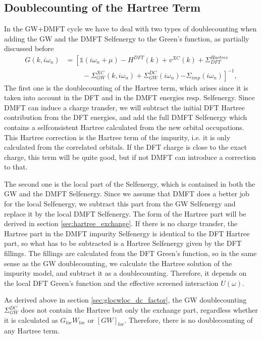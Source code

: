 \documentclass[12pt,a4paper]{scrartcl}
\numberwithin{equation}{section}
\newcommand{\unity}{\mathds{1}}
\begin{document}
 
\subsection{Doublecounting of the Hartree Term}
In the GW+DMFT cycle we have to deal with two types of doublecounting
when adding the GW and the DMFT Selfenergy to the Green's function, as
partially discussed before
\begin{align}
 G(k,i\omega_n) 
 &= \left[ \unity(i\omega_n+\mu ) -H^{DFT}(k) + v^{XC}(k) + \Sigma^{Hartree}_{DFT} \right.\nonumber\\
          & \hspace{1cm}- \Sigma^{XC}_{GW}(k,i\omega_n) 
          + \Sigma_{GW}^{DC}(i\omega_n)
          \left. - \Sigma_{imp}(i\omega_n)
           \right]^{-1},
\end{align}
The first one is the doublecounting of the Hartree term, which arises since it is
taken into account in the DFT and in the DMFT energies resp. Selfenergy.
Since DMFT can induce a charge transfer, we will subtract the initial DFT Hartree
contribution from the DFT energies, and add the full DMFT Selfenergy
which contains a selfconsistent Hartree calculated from the 
new orbital occupations. This Hartree correction is the Hartree term of the impurity,
i.e. it is only calculated from the correlated orbitals.
If the DFT charge is close to the exact charge, this term 
will be quite good, but if not DMFT can introduce a correction to that.

The second one is the local part of the Selfenergy, which
is contained in both the GW and the DMFT Selfenergy. Since we assume that DMFT
does a better job for the local Selfenergy, we subtract this part from the
GW Selfenergy and replace it by the local DMFT Selfenergy. 
The form of the Hartree part will be derived in section \ref{sec:hartree_exchange}.
If there is no charge transfer, the
Hartree part in the DMFT impurity Selfenergy is identical to the 
DFT Hartree part, so what has to be subtracted is a Hartree Selfenergy
given by the DFT fillings.
The fillings are calculated from the DFT Green's function, so
in the same sense as the GW doublecounting, we calculate the Hartree solution
of the impurity model, and subtract it as a doublecounting.
Therefore, it depends on the local DFT Green's function 
and the effective screened interaction $U(\omega)$. 

As derived above in section \ref{sec:glocwloc_dc_factor},
the GW doublecounting $\Sigma_{GW}^{DC}$ does not contain the Hartree but only the exchange part,
regardless whether it is calculated as $G_{loc}W_{loc}$ or $[GW]_{loc}$.
Therefore, there is no doublecounting of any Hartree term.
\end{document}
